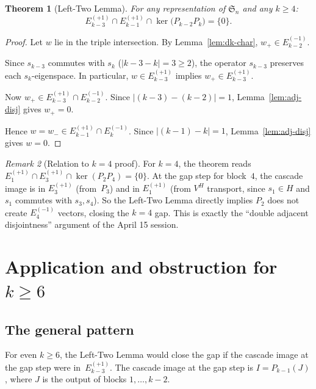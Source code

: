 \documentclass[11pt]{article}
\newtheorem{theorem}{Theorem}[section]
\theoremstyle{definition}
\theoremstyle{remark}
\newtheorem{remark}[theorem]{Remark}
\newcommand{\Sym}{\mathfrak{S}}
\newcommand{\Eplus}[1]{E_{#1}^{(+1)}}
\newcommand{\Eminus}[1]{E_{#1}^{(-1)}}
\newcommand{\kernel}{\operatorname{ker}}
\begin{document}
\begin{theorem}[Left-Two Lemma]
\label{thm:left-two}
For any representation of\/ $\Sym_n$ and any $k \ge 4$:
\[
  \Eplus{k-3} \cap \Eplus{k-1} \cap \kernel\!\bigl(P_{k-2}P_k\bigr) = \{0\}.
\]
\end{theorem}

\begin{proof}
Let $w$ lie in the triple intersection. By
Lemma~\ref{lem:dk-char}, $w_+ \in \Eminus{k-2}$.

Since $s_{k-3}$ commutes with $s_k$ ($|k{-}3 - k| = 3 \ge 2$),
the operator $s_{k-3}$ preserves each $s_k$-eigenspace. In particular,
$w \in \Eplus{k-3}$ implies $w_+ \in \Eplus{k-3}$.

Now $w_+ \in \Eplus{k-3} \cap \Eminus{k-2}$. Since
$|(k{-}3) - (k{-}2)| = 1$, Lemma~\ref{lem:adj-disj} gives $w_+ = 0$.

Hence $w = w_- \in \Eplus{k-1} \cap \Eminus{k}$. Since
$|(k{-}1) - k| = 1$, Lemma~\ref{lem:adj-disj} gives $w = 0$.
\end{proof}

\begin{remark}[Relation to $k=4$ proof]
For $k = 4$, the theorem reads $\Eplus{1} \cap \Eplus{3}
\cap \kernel(P_2 P_4) = \{0\}$. At the gap step for block~$4$,
the cascade image is in $\Eplus{3}$ (from~$P_3$) and in $\Eplus{1}$
(from $V^H$ transport, since $s_1 \in H$ and $s_1$ commutes with
$s_3, s_4$). So the Left-Two Lemma directly implies
$P_2$ does not create $\Eminus{4}$ vectors, closing the $k = 4$ gap.
This is exactly the ``double adjacent disjointness'' argument of the
April 15 session.
\end{remark}

\section{Application and obstruction for $k \ge 6$}\label{sec:k6}

\subsection{The general pattern}

For even $k \ge 6$, the Left-Two Lemma would close the gap if the
cascade image at the gap step were in~$\Eplus{k-3}$. The cascade image
at the gap step is $I = P_{k-1}(J)$, where $J$ is the output of
blocks $1, \ldots, k{-}2$.
\end{document}
